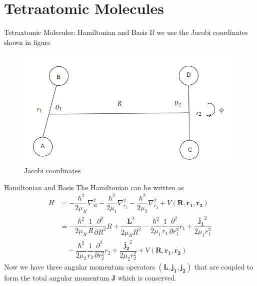 \documentclass{beamer}
\begin{document}
	\section{Tetraatomic Molecules}
	\begin{frame}{Tetraatomic Molecules: Hamiltonian and Basis}
		If we use the Jacobi coordinates shown in figure
		\begin{figure}[H]
			\centering
			\includegraphics[scale=0.5]{2.png}
			\caption{Jacobi coordinates}
			\label{Figure2}
		\end{figure}
	\end{frame}
	\begin{frame}{Hamiltonian and Basis}
		The Hamiltonian can be written as
		\begin{align}
			H&=-\dfrac{\hbar^2}{2\mu_R}\nabla^2_R-\dfrac{\hbar^2}{2\mu_1}\nabla^2_{r_1}-\dfrac{\hbar^2}{2\mu_2}\nabla^2_{r_2}+V(\mathbf{R},\mathbf{r_1},\mathbf{r_2})\nonumber\\
			&=-\dfrac{\hbar^2}{2\mu_R}\dfrac{1}{R}\dfrac{\partial^2}{\partial R^2}R+\dfrac{\mathbf{L}^2}{2\mu_RR^2}-\dfrac{\hbar^2}{2\mu_1}\dfrac{1}{r_1}\dfrac{\partial^2}{\partial r_1^2}r_1+\dfrac{\mathbf{j_1}^2}{2\mu_1r_1^2}\nonumber\\
			&\quad-\dfrac{\hbar^2}{2\mu_2}\dfrac{1}{r_2}\dfrac{\partial^2}{\partial r_2^2}r_2+\dfrac{\mathbf{j_2}^2}{2\mu_2r_2^2}+V(\mathbf{R},\mathbf{r_1},\mathbf{r_2})
		\end{align}
		Now we have three angular momentum operators $(\mathbf{L},\mathbf{j_1},\mathbf{j_2})$ that are coupled to form the total angular momentum $\mathbf{J}$ which is conserved. 
	\end{frame}
\end{document}
